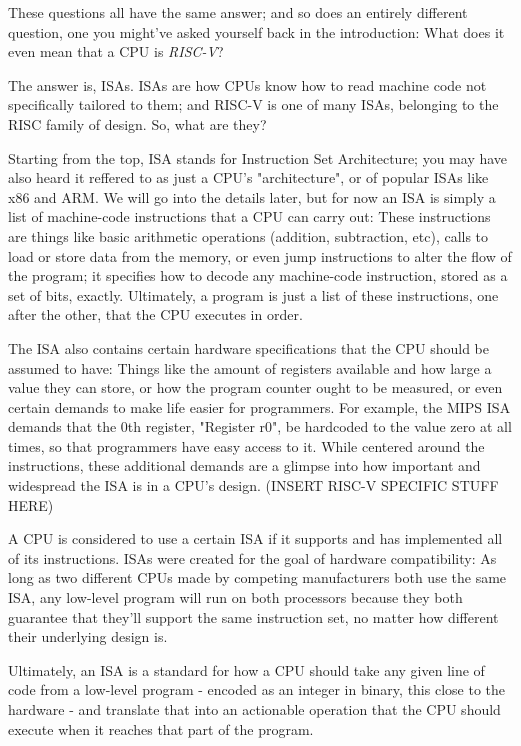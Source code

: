 \documentclass[12pt,twoside]{reedthesis}
\begin{document}
These questions all have the same answer; and so does an entirely different question, one you might've asked yourself back in the introduction: What does it even mean that a CPU is \textit{RISC-V}? 

The answer is, ISAs. ISAs are how CPUs know how to read machine code not specifically tailored to them; and RISC-V is one of many ISAs, belonging to the RISC family of design. So, what are they?

Starting from the top, ISA stands for Instruction Set Architecture; you may have also heard it reffered to as just a CPU's "architecture", or of popular ISAs like x86 and ARM. We will go into the details later, but for now an ISA is simply a list of machine-code instructions that a CPU can carry out: These instructions are things like basic arithmetic operations (addition, subtraction, etc), calls to load or store data from the memory, or even jump instructions to alter the flow of the program; it specifies how to decode any machine-code instruction, stored as a set of bits, exactly. Ultimately, a program is just a list of these instructions, one after the other, that the CPU executes in order. 

The ISA also contains certain hardware specifications that the CPU should be assumed to have: Things like the amount of registers available and how large a value they can store, or how the program counter ought to be measured, or even certain demands to make life easier for programmers. For example, the MIPS ISA demands that the 0th register, "Register r0", be hardcoded to the value zero at all times, so that programmers have easy access to it. While centered around the instructions, these additional demands are a glimpse into how important and widespread the ISA is in a CPU's design. (INSERT RISC-V SPECIFIC STUFF HERE)

A CPU is considered to use a certain ISA if it supports and has implemented all of its instructions. ISAs were created for the goal of hardware compatibility: As long as two different CPUs made by competing manufacturers both use the same ISA, any low-level program will run on both processors because they both guarantee that they'll support the same instruction set, no matter how different their underlying design is.

Ultimately, an ISA is a standard for how a CPU should take any given line of code from a low-level program - encoded as an integer in binary, this close to the hardware - and translate that into an actionable operation that the CPU should execute when it reaches that part of the program.
\end{document}
